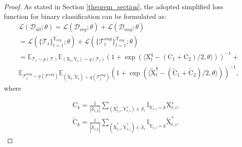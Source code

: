 \begin{proof}
As stated in Section \ref{theorem_section}, the adopted simplified loss function for binary classification can be formulated as:
\begin{equation}
\label{all}
\begin{aligned}
    &\mathcal{L}(\mathcal{D}_{all};\theta)=\mathcal{L}(\mathcal{D}_{org};\theta) + \mathcal{L}(\mathcal{D}_{aug};\theta) \\
    &= \mathcal{L}(\{\mathcal{T}_t\}_{t=1}^{\mathrm{T}_{org}};\theta) + \mathcal{L}(\{\mathcal{T}_t^{aug}\}_{t=1}^{\mathrm{T}_{aug}};\theta) \\
    &=\mathbb E_{\mathcal{T}_t \sim p(\mathcal{T})} \mathbb E_{(\mathrm{X}_t, \mathrm{Y}_t) \sim q(\mathcal{T}_t)}(1+\exp(\langle\mathrm{X}_{t}^q-(\mathrm{C}_1+\mathrm{C}_2)/2,\theta\rangle))^{-1} + \\
    & \mathbb E_{\mathcal{T}_t^{aug} \sim p(\mathcal{T}^{aug})}\mathbb E_{(\tilde{\mathrm{X}}_t, \tilde{\mathrm{Y}}_t) \sim q(\mathcal{T}_t^{aug})}(1+\exp(\langle\tilde{\mathrm{X}}_{t}^{q}-(\tilde{\mathrm{C}}_1+\tilde{\mathrm{C}}_2)/2,\theta\rangle))^{-1},
\end{aligned}
\end{equation}
where 

\begin{equation}
    \begin{aligned}
        \mathrm{C}_k=\frac{1}{|\mathcal{S}_{t,k}|}\sum_{(\mathrm{X}_{t,i}^s,\mathrm{Y}_{t,i}^s)\in\mathcal{S}_{t}}\mathbb{I}_{\mathrm{Y}_{t,i}=k}\mathrm{X}_{t,i}^s, \\
        \tilde{\mathrm{C}}_k=\frac{1}{|\tilde{\mathcal{S}}_{t,k}|}\sum_{(\tilde{\mathrm{X}}_{t,i}^s,\tilde{\mathrm{Y}}_{t,i}^s)\in\tilde{\mathcal{S}}_{t}}\mathbb{I}_{\tilde{\mathrm{Y}}_{t,i}=k}\tilde{\mathrm{X}}_{t,i}^s.
    \end{aligned}
\end{equation}


\end{proof}
